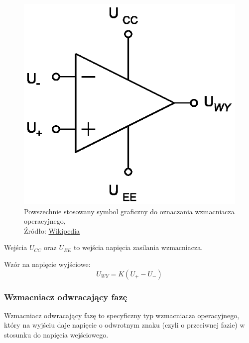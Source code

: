 \documentclass{article}
\begin{document}
      \begin{figure}[!ht]
        \centering
        \includegraphics[scale=0.70]{grafiki/wmacniacz_symbol.eps}
        \caption{Powszechnie stosowany symbol graficzny do oznaczania wzmacniacza operacyjnego,
        \\Źródło: \href{https://pl.wikipedia.org/wiki/Wzmacniacz_operacyjny}{Wikipedia}}
      \end{figure}
      \pagebreak
      Wejścia $U_{CC}$ oraz $U_{EE}$ to wejścia napięcia zasilania wzmacniacza.
      
      Wzór na napięcie wyjściowe:
      \begin{equation}
        U_{WY} = K(U_+ - U_-)
      \end{equation}

      \subsubsection{Wzmacniacz odwracający fazę}

      Wzmacniacz odwracający fazę to specyficzny typ wzmacniacza operacyjnego, który na wyjściu daje napięcie o odwrotnym znaku (czyli o przeciwnej fazie) w stosunku do napięcia wejściowego.
\end{document}

